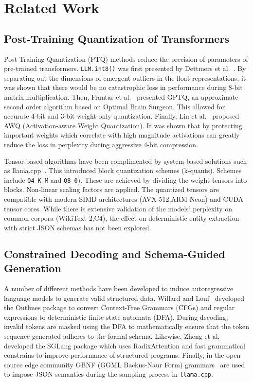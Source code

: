 \documentclass[conference]{IEEEtran}
\begin{document}
\section{Related Work}
\label{sec:related}

\subsection{Post-Training Quantization of Transformers}
Post-Training Quantization (PTQ) methods reduce the precision of parameters of pre-trained transformers. \texttt{LLM.int8()} was first presented by Dettmers et al.~\cite{dettmers2022llm}. By separating out the dimensions of emergent outliers in the float representations, it was shown that there would be no catastrophic loss in performance during 8-bit matrix multiplication. Then, Frantar et al.~\cite{frantar2023gptq} presented GPTQ, an approximate second order algorithm based on Optimal Brain Surgeon. This allowed for accurate 4-bit and 3-bit weight-only quantization. Finally, Lin et al.~\cite{lin2024awq} proposed AWQ (Activation-aware Weight Quantization). It was shown that by protecting important weights which correlate with high magnitude activations can greatly reduce the loss in perplexity during aggressive 4-bit compression.

Tensor-based algorithms have been complimented by system-based solutions such as llama.cpp~\cite{gerganov2023llamacpp}. This introduced block quantization schemes (k-quants). Schemes include \texttt{Q4\_K\_M} and \texttt{Q8\_0}). These are achieved by dividing the weight tensors into blocks. Non-linear scaling factors are applied. The quantized tensors are compatible with modern SIMD architectures (AVX-512,ARM Neon) and CUDA tensor cores. While there is extensive validation of the models' perplexity on common corpora (WikiText-2,C4), the effect on deterministic entity extraction with strict JSON schemas has not been explored.

\subsection{Constrained Decoding and Schema-Guided Generation}
A number of different methods have been developed to induce autoregressive language models to generate valid structured data. Willard and Louf~\cite{willard2023outlines} developed the Outlines package to convert Context-Free Grammars (CFGs) and regular expressions to deterministic finite state automata (DFA). During decoding, invalid tokens are masked using the DFA to mathematically ensure that the token sequence generated adheres to the formal schema. Likewise, Zheng et al.~\cite{zheng2024sglang} developed the SGLang package which uses RadixAttention and fast grammatical constrains to improve performance of structured programs. Finally, in the open source edge community GBNF (GGML Backus-Naur Form) grammars~\cite{gerganov2023llamacpp} are used to impose JSON semantics during the sampling process in \texttt{llama.cpp}.
\end{document}
